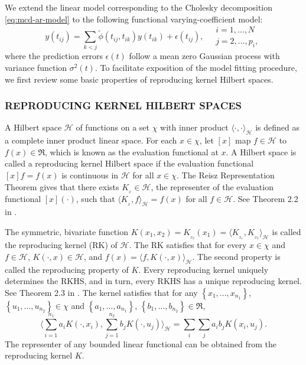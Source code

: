 \documentclass[12pt]{article}
\newcommand{\hilbert}{\mathcal{H}}
\begin{document}
We extend the linear model corresponding to the Cholesky decomposition \eqref{eq:mcd-ar-model} to the following functional varying-coefficient model:
\begin{equation}  \label{eq:cholesky-regression-model-1} 
y\left(t_{ij} \right)  = \sum_{k < j} \tilde{\phi}\left(t_{ij} ,t_{ik}\right) y\left(t_{ik}\right) + \epsilon\left({t_{ij}}\right), \quad \begin{array}{l} i = 1, \dots, N\\ j = 2, \dots, p_i,\end{array}
\end{equation}
\noindent
where the prediction errors $\epsilon\left(t\right)$ follow a mean zero Gaussian process with variance function $\sigma^2\left(t\right)$. To facilitate exposition of the model fitting procedure, we first review some basic properties of reproducing kernel Hilbert spaces.

\subsubsection*{\sffamily \large REPRODUCING KERNEL HILBERT SPACES}

A Hilbert space $\hilbert$ of functions on a set $\chi$ with inner product $\langle \cdot, \cdot\rangle_\hilbert$ is defined as a complete inner product linear space. For each $x \in \chi$, let $\left[x \right]$ map $f \in \hilbert$ to $f\left(x\right) \in \Re$, which is known as the evaluation functional at $x$. A Hilbert space is called a reproducing kernel Hilbert space if the evaluation functional $\left[x\right]f = f\left(x\right)$ is continuous in $\hilbert$ for all $x \in \chi$. The Reisz Representation Theorem gives that there exists $K_{_x} \in \hilbert$, the representer of the evaluation functional $\left[x\right]\left(\cdot\right)$, such that $\langle K_{_x}, f \rangle_\hilbert = f\left(x\right)$ for all $f \in \mathcal{H}$. See Theorem 2.2 in \cite{gu2013smoothing}.

The symmetric, bivariate function $K\left(x_1, x_2 \right) = K_{_{x_2 }}\left(x_1\right) = \langle K_{_{x_1}}, K_{_{x_2}} \rangle_\hilbert$ is called the reproducing kernel (RK) of $\hilbert$. The RK satisfies that for every $x \in \chi$ and $f \in \mathcal{H}$, $K\left(\cdot, x \right) \in \hilbert$, and $f\left(x\right) = \langle f, K\left(\cdot, x\right)\rangle_\hilbert$. The second property is called the reproducing property of $K$. Every reproducing kernel uniquely determines the RKHS, and in turn, every RKHS has a unique reproducing kernel. See Theorem 2.3 in \cite{gu2013smoothing}. The kernel satisfies that for any $\left\{x_1,\dots, x_{n_1}\right\}$, $\left\{{u}_1,\dots, {u}_{n_2}\right\} \in \chi$ and $\left\{a_1,\dots, a_{n_1}\right\}$, $\left\{b_1,\dots, b_{n_2}\right\} \in \Re$,
\begin{equation}
 \langle\sum_{i = 1}^{n_1} a_i K\left(\cdot, x_i\right), \sum_{j = 1}^{n_2} b_j K\left(\cdot, {u}_j\right) \rangle_\hilbert = \sum_i \sum_j a_ib_j K\left(x_i ,u_j\right).
\end{equation}
\noindent
The representer of any bounded linear functional can be obtained from the reproducing kernel $K$. 
\end{document}
